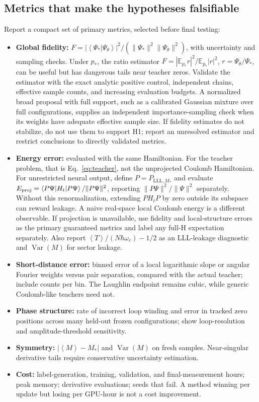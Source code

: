 \documentclass[11pt,letterpaper]{article}
\newcommand{\LLL}{\mathrm{LLL}}
\newcommand{\avg}[1]{\left\langle #1\right\rangle}
\begin{document}
\subsection{Metrics that make the hypotheses falsifiable}

Report a compact set of primary metrics, selected before final testing:
\begin{itemize}
\item \textbf{Global fidelity:} $F=|\avg{\Psi_*|\Psi_\theta}|^2/(\|\Psi_*\|^2\|\Psi_\theta\|^2)$, with uncertainty and sampling checks. Under $p_*$, the ratio estimator $F=|\mathbb E_{p_*}r|^2/\mathbb E_{p_*}|r|^2$, $r=\Psi_\theta/\Psi_*$, can be useful but has dangerous tails near teacher zeros. Validate the estimator with the exact analytic positive control, independent chains, effective sample counts, and increasing evaluation budgets. A normalized broad proposal with full support, such as a calibrated Gaussian mixture over full configurations, supplies an independent importance-sampling check when its weights have adequate effective sample size. If fidelity estimates do not stabilize, do not use them to support H1; report an unresolved estimator and restrict conclusions to directly validated metrics.
\item \textbf{Energy error:} evaluated with the same Hamiltonian. For the teacher problem, that is Eq.~\eqref{eq:teacher}, not the unprojected Coulomb Hamiltonian. For unrestricted neural output, define $P=P_{\LLL,M_*}$ and evaluate $E_{\rm proj}=\avg{P\Psi|H_t|P\Psi}/\|P\Psi\|^2$, reporting $\|P\Psi\|^2/\|\Psi\|^2$ separately. Without this renormalization, extending $PH_tP$ by zero outside its subspace can reward leakage. A naive real-space local Coulomb energy is a different observable. If projection is unavailable, use fidelity and local-structure errors as the primary guaranteed metrics and label any full-H expectation separately. Also report $\avg T/(N\hbar\omega_c)-1/2$ as an LLL-leakage diagnostic and $\operatorname{Var}(M)$ for sector leakage.
\item \textbf{Short-distance error:} binned error of a local logarithmic slope or angular Fourier weights versus pair separation, compared with the actual teacher; include counts per bin. The Laughlin endpoint remains cubic, while generic Coulomb-like teachers need not.
\item \textbf{Phase structure:} rate of incorrect loop winding and error in tracked zero positions across many held-out frozen configurations; show loop-resolution and amplitude-threshold sensitivity.
\item \textbf{Symmetry:} $|\avg M-M_*|$ and $\operatorname{Var}(M)$ on fresh samples. Near-singular derivative tails require conservative uncertainty estimation.
\item \textbf{Cost:} label-generation, training, validation, and final-measurement hours; peak memory; derivative evaluations; seeds that fail. A method winning per update but losing per GPU-hour is not a cost improvement.
\end{itemize}
\end{document}
